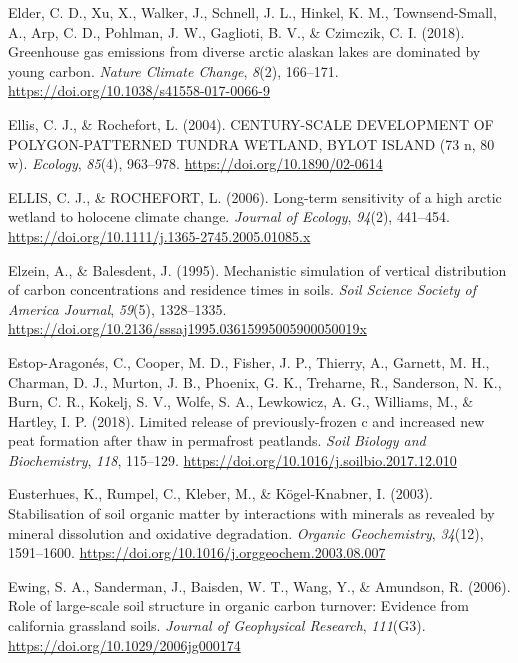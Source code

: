 \documentclass[]{article}
\begin{document}
\leavevmode\hypertarget{ref-Elder_2018}{}%
Elder, C. D., Xu, X., Walker, J., Schnell, J. L., Hinkel, K. M.,
Townsend-Small, A., Arp, C. D., Pohlman, J. W., Gaglioti, B. V., \&
Czimczik, C. I. (2018). Greenhouse gas emissions from diverse arctic
alaskan lakes are dominated by young carbon. \emph{Nature Climate
Change}, \emph{8}(2), 166--171.
\url{https://doi.org/10.1038/s41558-017-0066-9}

\leavevmode\hypertarget{ref-Ellis_2004}{}%
Ellis, C. J., \& Rochefort, L. (2004). CENTURY-SCALE DEVELOPMENT OF
POLYGON-PATTERNED TUNDRA WETLAND, BYLOT ISLAND (73 n, 80 w).
\emph{Ecology}, \emph{85}(4), 963--978.
\url{https://doi.org/10.1890/02-0614}

\leavevmode\hypertarget{ref-ELLIS_2006}{}%
ELLIS, C. J., \& ROCHEFORT, L. (2006). Long-term sensitivity of a high
arctic wetland to holocene climate change. \emph{Journal of Ecology},
\emph{94}(2), 441--454.
\url{https://doi.org/10.1111/j.1365-2745.2005.01085.x}

\leavevmode\hypertarget{ref-Elzein_1995}{}%
Elzein, A., \& Balesdent, J. (1995). Mechanistic simulation of vertical
distribution of carbon concentrations and residence times in soils.
\emph{Soil Science Society of America Journal}, \emph{59}(5),
1328--1335.
\url{https://doi.org/10.2136/sssaj1995.03615995005900050019x}

\leavevmode\hypertarget{ref-Estop_Aragon_s_2018}{}%
Estop-Aragonés, C., Cooper, M. D., Fisher, J. P., Thierry, A., Garnett,
M. H., Charman, D. J., Murton, J. B., Phoenix, G. K., Treharne, R.,
Sanderson, N. K., Burn, C. R., Kokelj, S. V., Wolfe, S. A., Lewkowicz,
A. G., Williams, M., \& Hartley, I. P. (2018). Limited release of
previously-frozen c and increased new peat formation after thaw in
permafrost peatlands. \emph{Soil Biology and Biochemistry}, \emph{118},
115--129. \url{https://doi.org/10.1016/j.soilbio.2017.12.010}

\leavevmode\hypertarget{ref-Eusterhues_2003}{}%
Eusterhues, K., Rumpel, C., Kleber, M., \& Kögel-Knabner, I. (2003).
Stabilisation of soil organic matter by interactions with minerals as
revealed by mineral dissolution and oxidative degradation. \emph{Organic
Geochemistry}, \emph{34}(12), 1591--1600.
\url{https://doi.org/10.1016/j.orggeochem.2003.08.007}

\leavevmode\hypertarget{ref-Ewing_2006}{}%
Ewing, S. A., Sanderman, J., Baisden, W. T., Wang, Y., \& Amundson, R.
(2006). Role of large-scale soil structure in organic carbon turnover:
Evidence from california grassland soils. \emph{Journal of Geophysical
Research}, \emph{111}(G3). \url{https://doi.org/10.1029/2006jg000174}
\end{document}
